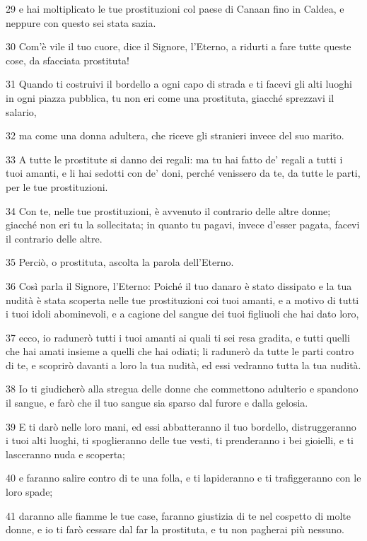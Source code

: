 \par 29 e hai moltiplicato le tue prostituzioni col paese di Canaan fino in Caldea, e neppure con questo sei stata sazia.
\par 30 Com'è vile il tuo cuore, dice il Signore, l'Eterno, a ridurti a fare tutte queste cose, da sfacciata prostituta!
\par 31 Quando ti costruivi il bordello a ogni capo di strada e ti facevi gli alti luoghi in ogni piazza pubblica, tu non eri come una prostituta, giacché sprezzavi il salario,
\par 32 ma come una donna adultera, che riceve gli stranieri invece del suo marito.
\par 33 A tutte le prostitute si danno dei regali: ma tu hai fatto de' regali a tutti i tuoi amanti, e li hai sedotti con de' doni, perché venissero da te, da tutte le parti, per le tue prostituzioni.
\par 34 Con te, nelle tue prostituzioni, è avvenuto il contrario delle altre donne; giacché non eri tu la sollecitata; in quanto tu pagavi, invece d'esser pagata, facevi il contrario delle altre.
\par 35 Perciò, o prostituta, ascolta la parola dell'Eterno.
\par 36 Così parla il Signore, l'Eterno: Poiché il tuo danaro è stato dissipato e la tua nudità è stata scoperta nelle tue prostituzioni coi tuoi amanti, e a motivo di tutti i tuoi idoli abominevoli, e a cagione del sangue dei tuoi figliuoli che hai dato loro,
\par 37 ecco, io radunerò tutti i tuoi amanti ai quali ti sei resa gradita, e tutti quelli che hai amati insieme a quelli che hai odiati; li radunerò da tutte le parti contro di te, e scoprirò davanti a loro la tua nudità, ed essi vedranno tutta la tua nudità.
\par 38 Io ti giudicherò alla stregua delle donne che commettono adulterio e spandono il sangue, e farò che il tuo sangue sia sparso dal furore e dalla gelosia.
\par 39 E ti darò nelle loro mani, ed essi abbatteranno il tuo bordello, distruggeranno i tuoi alti luoghi, ti spoglieranno delle tue vesti, ti prenderanno i bei gioielli, e ti lasceranno nuda e scoperta;
\par 40 e faranno salire contro di te una folla, e ti lapideranno e ti trafiggeranno con le loro spade;
\par 41 daranno alle fiamme le tue case, faranno giustizia di te nel cospetto di molte donne, e io ti farò cessare dal far la prostituta, e tu non pagherai più nessuno.
